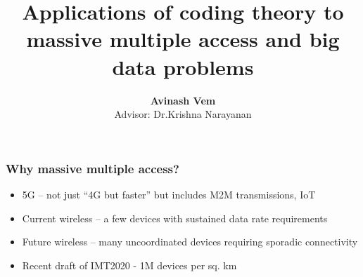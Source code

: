 \documentclass[10pt,usenames,dvipsnames]{beamer}
\def\figpath{../Figures}
\def\mac_figpath{../Figures/MAC}
\begin{document}
\title{\bf Applications of coding theory to massive multiple access and big data problems}
\author{\textbf{Avinash Vem}\\ \vspace{3pt} \small Advisor: Dr.Krishna Narayanan} 
\vspace{5ex}
\date{} %


\frame{\titlepage}

\begin{frame}
\frametitle{Why massive multiple access?}

\begin{itemize}
\item 5G -- not just ``4G but faster'' but includes M2M transmissions, IoT
\item Current wireless -- a few devices with sustained data rate requirements
\item Future wireless -- {\color{blue}many uncoordinated} devices requiring {\color{blue}sporadic connectivity}
\item<2> Recent draft of IMT2020 - 1M devices per sq. km
\end{itemize}

\end{frame}
\end{document}

